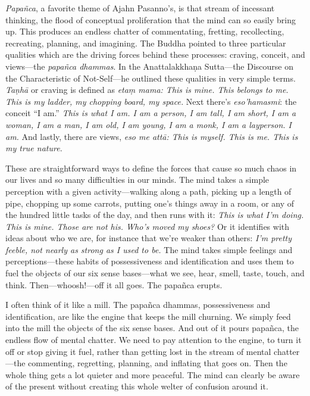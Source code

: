 
\emph{Papañca}, a favorite theme of Ajahn Pasanno's, is that stream of 
incessant thinking, the flood of conceptual proliferation that the mind 
can so easily bring up. This produces an endless chatter of 
commentating, fretting, recollecting, recreating, planning, and 
imagining. The Buddha pointed to three particular qualities which are 
the driving forces behind these processes: craving, conceit, and 
views---the \emph{papañca dhammas}. In the Anattalakkhaṇa 
Sutta---the Discourse on the Characteristic of Not-Self---he outlined 
these qualities in very simple terms. \emph{Taṇhā} or craving is 
defined as \emph{etaṃ mama: This is mine. This belongs to me. This is 
my ladder, my chopping board, my space.} Next there's 
\emph{eso'hamasmi}: the conceit ``I am.'' \emph{This is what I am. I am 
a person, I am tall, I am short, I am a woman, I am a man, I am old, I 
am young, I am a monk, I am a layperson. I am.} And lastly, there are 
views, \emph{eso me attā: This is myself. This is me. This is my true 
nature.}

These are straightforward ways to define the forces that cause so much 
chaos in our lives and so many difficulties in our minds. The mind 
takes a simple perception with a given activity---walking along a path, 
picking up a length of pipe, chopping up some carrots, putting one's 
things away in a room, or any of the hundred little tasks of the day, 
and then runs with it: \emph{This is what I'm doing. This is mine. 
Those are not his. Who's moved my shoes?} Or it identifies with ideas 
about who we are, for instance that we're weaker than others: \emph{I'm 
pretty feeble, not nearly as strong as I used to be.} The mind takes 
simple feelings and perceptions---these habits of possessiveness and 
identification and uses them to fuel the objects of our six sense 
bases---what we see, hear, smell, taste, touch, and think. 
Then---whoosh!---off it all goes. The papañca erupts.

I often think of it like a mill. The papañca dhammas, possessiveness 
and identification, are like the engine that keeps the mill churning. 
We simply feed into the mill the objects of the six sense bases. And 
out of it pours papañca, the endless flow of mental chatter. We need 
to pay attention to the engine, to turn it off or stop giving it fuel, 
rather than getting lost in the stream of mental chatter---the 
commenting, regretting, planning, and inflating that goes on. Then the 
whole thing gets a lot quieter and more peaceful. The mind can clearly 
be aware of the present without creating this whole welter of confusion 
around it.

